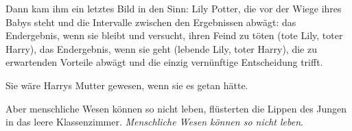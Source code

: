 Dann kam ihm ein letztes Bild in den Sinn: Lily Potter, die vor der Wiege ihres
Babys steht und die Intervalle zwischen den Ergebnissen abwägt: das Endergebnis,
wenn sie bleibt und versucht, ihren Feind zu töten (tote Lily, toter Harry), das
Endergebnis, wenn sie geht (lebende Lily, toter Harry), die zu erwartenden
Vorteile abwägt und die einzig vernünftige Entscheidung trifft.

Sie wäre Harrys Mutter gewesen, wenn sie es getan hätte.

\glqq{}Aber menschliche Wesen können so nicht leben\grqq{}, flüsterten die Lippen
des Jungen in das leere Klassenzimmer. \glqq{}\emph{Menschliche Wesen können so
nicht leben}.\grqq{}

